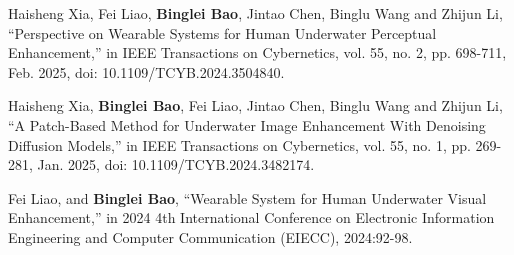 
\begin{achievements}
  \begin{theachievements}[已发表论文]
    \item Haisheng Xia, Fei Liao, \textbf{Binglei Bao}, Jintao Chen, Binglu Wang and Zhijun Li, “Perspective on Wearable Systems for Human Underwater Perceptual Enhancement,” in IEEE Transactions on Cybernetics, vol. 55, no. 2, pp. 698-711, Feb. 2025, doi: 10.1109/TCYB.2024.3504840.
    \item Haisheng Xia, \textbf{Binglei Bao}, Fei Liao, Jintao Chen, Binglu Wang and Zhijun Li, “A Patch-Based Method for Underwater Image Enhancement With Denoising Diffusion Models,” in IEEE Transactions on Cybernetics, vol. 55, no. 1, pp. 269-281, Jan. 2025, doi: 10.1109/TCYB.2024.3482174.
  \end{theachievements}

  \begin{theachievements}[会议论文]
    \item Fei Liao, and \textbf{Binglei Bao}, “Wearable System for Human Underwater Visual Enhancement,” in 2024 4th International Conference on Electronic Information Engineering and Computer Communication (EIECC), 2024:92-98.
  \end{theachievements}
\end{achievements}
